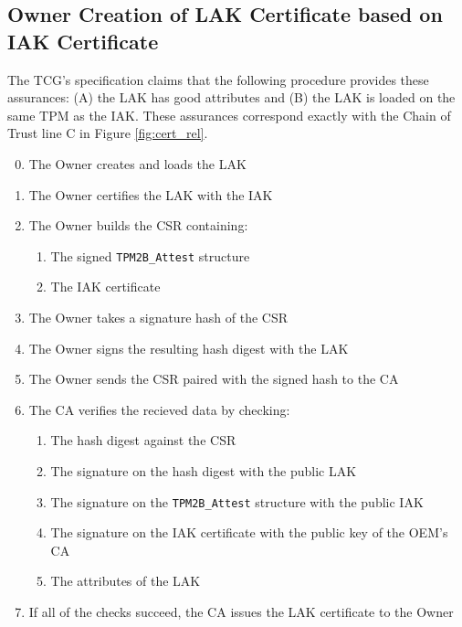 \documentclass[runningheads]{llncs}
\begin{document}
\subsection{Owner Creation of LAK Certificate based on IAK Certificate}
The TCG's specification claims that the following procedure provides these assurances: (A) the LAK has good attributes and (B) the LAK is  loaded on the same TPM as the IAK. These assurances correspond exactly with the Chain of Trust line C in Figure \ref{fig:cert_rel}. 
\begin{enumerate}[itemsep=0pt,parsep=0pt,partopsep=0pt]
  \setcounter{enumi}{-1}
  \item The Owner creates and loads the LAK
  \item The Owner certifies the LAK with the IAK
  \item The Owner builds the CSR containing:
  \begin{enumerate}[topsep=0pt, itemsep=0pt,parsep=0pt,partopsep=0pt]
    \item The signed \verb|TPM2B_Attest| structure
    \item The IAK certificate
  \end{enumerate}
  \item The Owner takes a signature hash of the CSR
  \item The Owner signs the resulting hash digest with the LAK
  \item The Owner sends the CSR paired with the signed hash to the CA
  \item The CA verifies the recieved data by checking:
  \begin{enumerate}[topsep=0pt, itemsep=0pt,parsep=0pt,partopsep=0pt]
    \item The hash digest against the CSR
    \item The signature on the hash digest with the public LAK
    \item The signature on the \verb|TPM2B_Attest| structure with the public IAK
    \item The signature on the IAK certificate with the public key of the OEM's CA
    \item The attributes of the LAK
  \end{enumerate}
  \item If all of the checks succeed, the CA issues the LAK certificate to the Owner
\end{enumerate}
\end{document}
